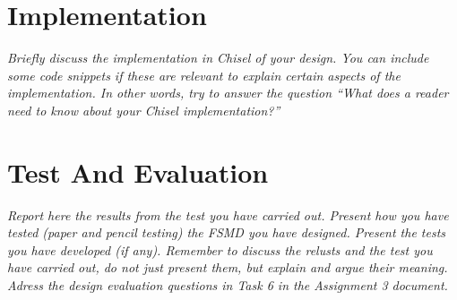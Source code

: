 \documentclass[a4paper, english]{article}
\numberwithin{equation}{section}
\begin{document}
\section{Implementation}
\textit{Briefly discuss the implementation in Chisel of your design. You can include some code snippets if these are relevant to explain certain aspects of the implementation. In other words, try to answer the question ``What does a reader need to know about your Chisel implementation?''}
\section{Test And Evaluation}
\textit{Report here the results from the test you have carried out. Present how you have tested (paper and pencil testing) the FSMD you have designed. Present the tests you have developed (if any). Remember to discuss the relusts and the test you have carried out, do not just present them, but explain and argue their meaning. Adress the design evaluation questions in Task 6 in the Assignment 3 document.}

%
%




%
\end{document}
